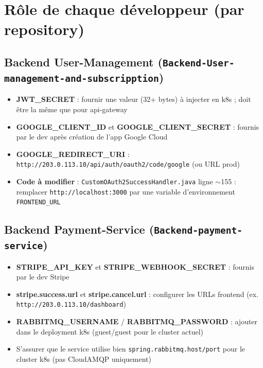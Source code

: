 \documentclass[11pt,a4paper]{article}
\begin{document}
\section{Rôle de chaque développeur (par repository)}

\subsection{Backend User-Management (\texttt{Backend-User-management-and-subscripption})}

\begin{itemize}
  \item \textbf{JWT\_SECRET} : fournir une valeur (32+ bytes) à injecter en k8s ; doit être la même que pour api-gateway
  \item \textbf{GOOGLE\_CLIENT\_ID} et \textbf{GOOGLE\_CLIENT\_SECRET} : fournis par le dev après création de l’app Google Cloud
  \item \textbf{GOOGLE\_REDIRECT\_URI} : \texttt{http://203.0.113.10/api/auth/oauth2/code/google} (ou URL prod)
  \item \textbf{Code à modifier} : \texttt{CustomOAuth2SuccessHandler.java} ligne $\sim$155 : remplacer \texttt{http://localhost:3000} par une variable d’environnement \texttt{FRONTEND\_URL}
\end{itemize}

\subsection{Backend Payment-Service (\texttt{Backend-payment-service})}

\begin{itemize}
  \item \textbf{STRIPE\_API\_KEY} et \textbf{STRIPE\_WEBHOOK\_SECRET} : fournis par le dev Stripe
  \item \textbf{stripe.success.url} et \textbf{stripe.cancel.url} : configurer les URLs frontend (ex. \texttt{http://203.0.113.10/dashboard})
  \item \textbf{RABBITMQ\_USERNAME} / \textbf{RABBITMQ\_PASSWORD} : ajouter dans le deployment k8s (guest/guest pour le cluster actuel)
  \item S’assurer que le service utilise bien \texttt{spring.rabbitmq.host/port} pour le cluster k8s (pas CloudAMQP uniquement)
\end{itemize}
\end{document}
